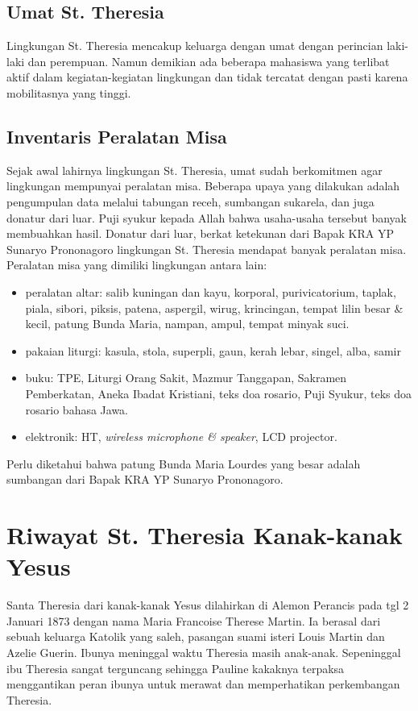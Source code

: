 \subsection*{Umat St. Theresia}
Lingkungan St. Theresia mencakup \jumlahKlg{} keluarga dengan \jumlahLP{} umat dengan perincian \jumlahL{} laki-laki dan \jumlahP{} perempuan. Namun demikian ada beberapa mahasiswa yang terlibat aktif dalam kegiatan-kegiatan lingkungan dan tidak tercatat dengan pasti karena mobilitasnya yang tinggi.

\subsection*{Inventaris Peralatan Misa}
Sejak awal lahirnya lingkungan St. Theresia, umat sudah berkomitmen agar lingkungan mempunyai peralatan misa. Beberapa upaya yang dilakukan adalah pengumpulan data melalui tabungan receh, sumbangan sukarela, dan juga donatur dari luar. Puji syukur kepada Allah bahwa usaha-usaha tersebut banyak membuahkan hasil. Donatur dari luar, berkat ketekunan dari Bapak KRA YP Sunaryo Prononagoro lingkungan St. Theresia mendapat banyak peralatan misa. 
Peralatan misa yang dimiliki lingkungan antara lain:
\begin{itemize}
\item peralatan altar: salib kuningan dan kayu,
korporal,
purivicatorium,
taplak,
piala,
sibori,
piksis,
patena,
aspergil,
wirug,
krincingan,
tempat lilin besar \& kecil,
patung Bunda Maria,
nampan, ampul,
tempat minyak suci.
\item pakaian liturgi: kasula,
stola,
superpli,
gaun,
kerah lebar,
singel,
alba,
samir
\item buku:  TPE,
Liturgi Orang Sakit,
Mazmur Tanggapan, Sakramen Pemberkatan,
Aneka Ibadat Kristiani, teks doa rosario,
Puji Syukur, teks doa rosario bahasa Jawa.
\item elektronik: HT, \textit{wireless microphone \& speaker}, LCD projector.
\end{itemize} 

Perlu diketahui bahwa patung Bunda Maria Lourdes yang besar adalah sumbangan dari Bapak KRA YP Sunaryo Prononagoro.


\section{Riwayat St. Theresia Kanak-kanak Yesus}
Santa Theresia dari kanak-kanak Yesus dilahirkan di Alemon Perancis pada tgl 2 Januari 1873 dengan nama Maria Francoise Therese Martin. Ia berasal dari sebuah keluarga Katolik yang saleh, pasangan suami isteri Louis Martin dan Azelie Guerin. Ibunya meninggal waktu Theresia masih anak-anak. Sepeninggal ibu Theresia sangat terguncang sehingga Pauline kakaknya terpaksa menggantikan peran ibunya untuk merawat dan memperhatikan perkembangan Theresia.

